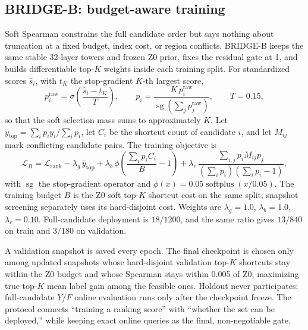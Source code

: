 \documentclass[5p,twocolumn,authoryear]{elsarticle}
\newcommand{\zmethod}{Z0}
\newcommand{\bmethod}{BRIDGE-B}
\begin{document}
\subsection{\bmethod: budget-aware training}

Soft Spearman constrains the full candidate order but says nothing about truncation at a
fixed budget, index cost, or region conflicts. \bmethod{} keeps the same stable 32-layer
towers and frozen \zmethod{} prior, fixes the residual gate at 1, and builds differentiable
top-$K$ weights inside each training split. For standardized scores $\hat{s}_i$, with $t_K$
the stop-gradient $K$-th largest score,
\begin{equation}
  p_i^{\mathrm{raw}}=\sigma\!\left(\frac{\hat{s}_i-t_K}{T}\right),\qquad
  p_i=\frac{K\,p_i^{\mathrm{raw}}}{\operatorname{sg}(\sum_j p_j^{\mathrm{raw}})},\qquad
  T=0.15,
  \label{eq:softtopk}
\end{equation}
so that the soft selection mass sums to approximately $K$. Let
$\bar y_{\mathrm{top}}=\sum_i p_i y_i/\sum_i p_i$, let $C_i$ be the shortcut count of
candidate $i$, and let $M_{ij}$ mark conflicting candidate pairs. The training objective is
\begin{equation}
  \mathcal L_B=\mathcal L_{\mathrm{rank}}
  -\lambda_g\,\bar y_{\mathrm{top}}
  +\lambda_b\,\phi\!\left(\frac{\sum_i p_iC_i}{B}-1\right)
  +\lambda_c\,\frac{\sum_{i,j}p_iM_{ij}p_j}{(\sum_i p_i)(\sum_i p_i-1)},
  \label{eq:bridgeb}
\end{equation}
with $\operatorname{sg}$ the stop-gradient operator and
$\phi(x)=0.05\operatorname{softplus}(x/0.05)$. The training budget $B$ is the
\zmethod{} soft top-$K$ shortcut cost on the same split; snapshot screening separately uses
its hard-disjoint cost. Weights are $\lambda_g=1.0$, $\lambda_b=1.0$, $\lambda_c=0.10$.
Full-candidate deployment is $18/1200$, and the same ratio gives $13/840$ on train and
$3/180$ on validation.

A validation snapshot is saved every epoch. The final checkpoint is chosen only among
updated snapshots whose hard-disjoint validation top-$K$ shortcuts stay within the
\zmethod{} budget and whose Spearman stays within 0.005 of \zmethod, maximizing true
top-$K$ mean label gain among the feasible ones. Holdout never participates;
full-candidate $Y$/$F$ online evaluation runs only after the checkpoint freeze. The
protocol connects ``training a ranking score'' with ``whether the set can be deployed,''
while keeping exact online queries as the final, non-negotiable gate.
\end{document}
